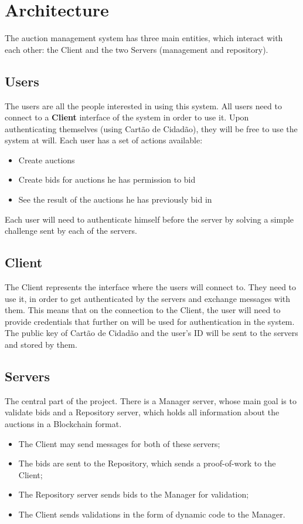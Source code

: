 \newpage
\section{Architecture}
The auction management system has three main entities, which interact with each other: the Client and the two Servers (management and repository).
\subsection{Users}
The users are all the people interested in using this system. 
All users need to connect to a \textbf{Client} interface of the system in order to use it. Upon authenticating themselves (using Cartão de Cidadão), they will be free to use the system at will. 
Each user has a set of actions available:
\begin{itemize}
    \item Create auctions
    \item Create bids for auctions he has permission to bid
    \item See the result of the auctions he has previously bid in
\end{itemize}
Each user will need to authenticate himself before the server by solving a simple challenge sent by each of the servers.

\subsection{Client}
The Client represents the interface where the users will connect to. They need to use it, in order to get authenticated by the servers and exchange messages with them. This means that on the connection to the Client, the user will need to provide credentials that further on will be used for authentication in the system. The public key of Cartão de Cidadão and the user's ID will be sent to the servers and stored by them.


\subsection{Servers}
The central part of the project. 
There is a Manager server, whose main goal is to validate bids and a Repository server, which holds all information about the auctions in a Blockchain format.

\begin{itemize}
    \item The Client may send messages for both of these servers;
    \item The bids are sent to the Repository, which sends a proof-of-work to the Client;
    \item The Repository server sends bids to the Manager for validation;
    \item The Client sends validations in the form of dynamic code to the Manager.
\end{itemize}